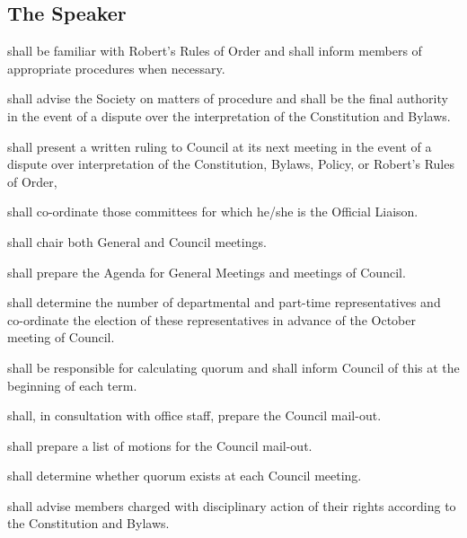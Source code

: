 \subsection {The Speaker}
\begin{longenum}[ label*=\thesubsection.\arabic*., align=left]
	\item shall be familiar with Robert's Rules of Order and shall inform members of  appropriate procedures when necessary.
    \item shall advise the Society on matters of procedure and shall be the final authority in the event of a dispute over the interpretation of the Constitution and Bylaws.
    \item shall present a written ruling to Council at its  next meeting in the event of a dispute over interpretation of the Constitution, Bylaws, Policy, or Robert's Rules of Order,
    \item shall co-ordinate those committees for which he/she is the Official Liaison.
    \item shall chair both General and Council meetings.
    \item shall prepare the Agenda for General Meetings and meetings of Council.
    \item shall determine the number of departmental and part-time representatives and co-ordinate the election of these representatives in advance of the October meeting of Council.
    \item shall be responsible for calculating quorum and shall inform Council of this at the beginning of each term.
    \item shall, in consultation with office staff, prepare the Council mail-out.
    \item shall prepare a list of motions for the Council mail-out.
    \item shall determine whether quorum exists at each Council meeting.
    \item shall advise members charged with disciplinary action of their rights according to the Constitution and Bylaws.

\end{longenum}
